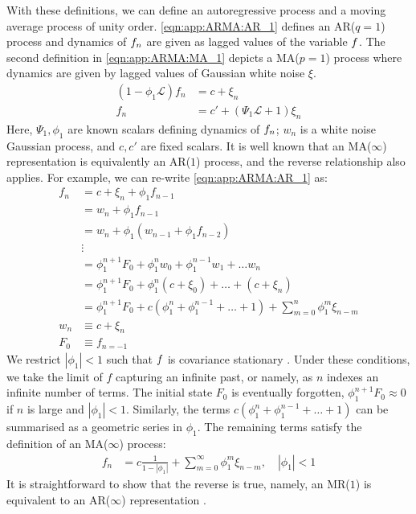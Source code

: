 With these definitions, we can define an autoregressive process and a moving average process of unity order.  \cref{eqn:app:ARMA:AR_1} defines an AR($q=1$) process and dynamics of $f_n$ are given as lagged values of the variable $f$. The second definition in \cref{eqn:app:ARMA:MA_1} depicts a MA($p = 1$) process where dynamics are given by lagged values of Gaussian white noise $\xi$. 
\begin{align}
(1 - \phi_1 \mathcal{L}) f_n  & = c + \xi_n  \label{eqn:app:ARMA:AR_1} \\
f_n & = c' + (\Psi_1 \mathcal{L} + 1)\xi_n  \label{eqn:app:ARMA:MA_1} 
\end{align}
Here, $\Psi_1, \phi_1$ are known scalars defining dynamics of $f_n$; $w_n$ is a white noise Gaussian process, and $c, c'$ are fixed scalars. It is well known that an MA($\infty$) representation is equivalently an AR($1$) process, and the reverse relationship also applies. For example, we can re-write \cref{eqn:app:ARMA:AR_1} as:
\begin{align}
f_n & = c + \xi_n + \phi_1 f_{n-1} \\
& = w_n + \phi_1 f_{n-1} \\
& = w_n + \phi_1 (w_{n-1}+ \phi_1 f_{n-2} ) \\
& \vdots \\
& = \phi_1^{n+1} F_0 + \phi_1^{n} w_{0} + \phi_1^{n-1} w_{1} + \hdots w_n \\
& = \phi_1^{n+1} F_0 + \phi_1^{n} (c + \xi_{0}) + \hdots + (c + \xi_{n}) \\
& = \phi_1^{n+1} F_0 +  c (\phi_1^{n} + \phi_1^{n-1} + \hdots + 1) + \sum_{m=0}^{n} \phi_1^m \xi_{n-m} \\
w_n & \equiv c + \xi_n \\
F_0 & \equiv f_{n=-1} 
\end{align} We restrict $|\phi_1| < 1$ such that $f$ is covariance stationary \cite{hamilton1994time}. %
Under these conditions, we take the limit of $f$ capturing an infinite past, or namely, as $n$ indexes an infinite number of terms. The initial state $F_0$ is eventually forgotten, $\phi_1^{n+1} F_0 \approx 0$ if $n$ is large and $|\phi_1| < 1$. Similarly, the terms $c (\phi_1^{n} + \phi_1^{n-1} + \hdots + 1)$  can be summarised as a geometric series in $\phi_1$. The remaining terms satisfy the definition of an MA($\infty$) process:
\begin{align}
f_n &= c \frac{1}{1 - |\phi_1|}  +  \sum_{m=0}^{\infty} \phi_1^m \xi_{n-m}, \quad |\phi_1| < 1
\end{align}
It is straightforward to show that the reverse is true, namely, an MR($1$) is equivalent to an AR($\infty$) representation \cite{hamilton1994time}.

